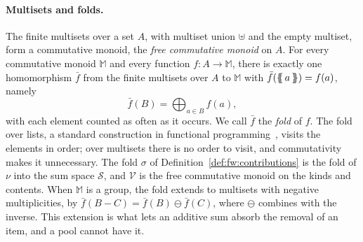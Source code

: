 \paragraph{Multisets and folds.} The finite multisets over a set $A$, with multiset union $\uplus$ and the empty
multiset, form a commutative monoid, the \emph{free commutative monoid} on $A$. For every commutative monoid
$\mathbb{M}$ and every function $f: A \to \mathbb{M}$, there is exactly one homomorphism $\bar f$ from the finite
multisets over $A$ to $\mathbb{M}$ with $\bar f(\{\!\!\{\, a \,\}\!\!\}) = f(a)$, namely
\[
  \bar f(B) = \bigoplus_{a \in B} f(a),
\]
with each element counted as often as it occurs. We call $\bar f$ the \emph{fold} of $f$. The fold over lists, a
standard construction in functional programming~\cite{hutton1999tutorial}, visits the elements in order; over
multisets there is no order to visit, and commutativity makes it unnecessary. The fold $\sigma$ of
Definition~\ref{def:fw:contributions} is the fold of $\nu$ into the sum space $\mathcal{S}$, and $\mathcal{V}$ is the free commutative monoid on the kinds
and contents. When $\mathbb{M}$ is a group, the fold extends to
multisets with negative multiplicities, by $\bar f(B - C) = \bar f(B) \ominus \bar f(C)$, where $\ominus$ combines with
the inverse. This extension is what lets an additive sum absorb the removal of an item, and a pool cannot have it.
